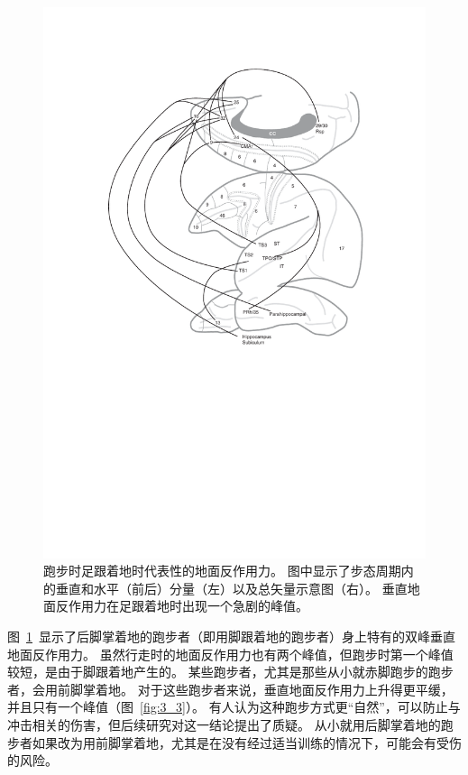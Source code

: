 \begin{figure}[!htb]
	\centering
	\includegraphics[width=1.0\linewidth]{chap3/3_2}
	\caption{跑步时足跟着地时代表性的地面反作用力。
		图中显示了步态周期内的垂直和水平（前后）分量（左）以及总矢量示意图（右）。
		垂直地面反作用力在足跟着地时出现一个急剧的峰值\cite{yong2020foot}。 \label{fig:3_2}}
\end{figure}

图~\ref{fig:3_2}~显示了后脚掌着地的跑步者（即用脚跟着地的跑步者）身上特有的双峰垂直地面反作用力。
虽然行走时的地面反作用力也有两个峰值，但跑步时第一个峰值较短，是由于脚跟着地产生的。
某些跑步者，尤其是那些从小就赤脚跑步的跑步者，会用前脚掌着地。
对于这些跑步者来说，垂直地面反作用力上升得更平缓，并且只有一个峰值（图~\ref{fig:3_3}）。
有人认为这种跑步方式更“自然”，可以防止与冲击相关的伤害，但后续研究对这一结论提出了质疑。
从小就用后脚掌着地的跑步者如果改为用前脚掌着地，尤其是在没有经过适当训练的情况下，可能会有受伤的风险。

